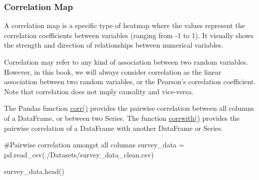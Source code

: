 \documentclass[
  letterpaper,
  DIV=11,
  numbers=noendperiod]{scrreprt}
\newenvironment{Shaded}{\begin{snugshade}}{\end{snugshade}}
\newcommand{\CommentTok}[1]{\textcolor[rgb]{0.37,0.37,0.37}{#1}}
\newcommand{\NormalTok}[1]{\textcolor[rgb]{0.00,0.23,0.31}{#1}}
\newcommand{\OperatorTok}[1]{\textcolor[rgb]{0.37,0.37,0.37}{#1}}
\newcommand{\StringTok}[1]{\textcolor[rgb]{0.13,0.47,0.30}{#1}}
\begin{document}
\hypertarget{correlation-map}{%
\subsubsection{Correlation Map}\label{correlation-map}}

A correlation map is a specific type of heatmap where the values
represent the correlation coefficients between variables (ranging from
-1 to 1). It visually shows the strength and direction of relationships
between numerical variables.

Correlation may refer to any kind of association between two random
variables. However, in this book, we will always consider correlation as
the linear association between two random variables, or the Pearson's
correlation coefficient. Note that correlation does not imply causality
and vice-versa.

The Pandas function
\href{https://pandas.pydata.org/docs/reference/api/pandas.DataFrame.corr.html}{corr()}
provides the pairwise correlation between all columns of a DataFrame, or
between two Series. The function
\href{https://pandas.pydata.org/docs/reference/api/pandas.DataFrame.corrwith.html\#pandas.DataFrame.corrwith}{corrwith()}
provides the pairwise correlation of a DataFrame with another DataFrame
or Series.

\begin{Shaded}
\begin{Highlighting}[]
\CommentTok{\#Pairwise correlation amongst all columns}
\NormalTok{survey\_data }\OperatorTok{=}\NormalTok{ pd.read\_csv(}\StringTok{\textquotesingle{}./Datasets/survey\_data\_clean.csv\textquotesingle{}}\NormalTok{)}

\NormalTok{survey\_data.head()}
\end{Highlighting}
\end{Shaded}
\end{document}
